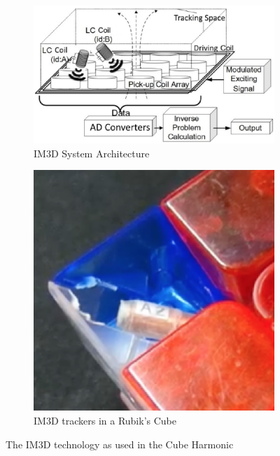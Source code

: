 \begin{figure}[h]
    \centering
    \begin{subfigure}{0.60\textwidth}
        \centering
        \includegraphics[width=.90\linewidth]{Figures/3 State of the Art/im3d.png}
        \caption{IM3D System Architecture \cite{im3d}}
        \label{fig:im3d-architecture}
    \end{subfigure}%
    \begin{subfigure}{0.40\textwidth}
        \centering
        \includegraphics[width=.90\linewidth]{Figures/3 State of the Art/cubeharmonic-2019-tags.png}
        \caption{IM3D trackers in a Rubik's Cube \cite{mannone-cubeharmonic-2019}}
        \label{fig:cubeharmonic-trackers}
    \end{subfigure}%
    \caption{The IM3D technology as used in the Cube Harmonic}
    \label{fig:cubeharmonic-im3d}
\end{figure}

